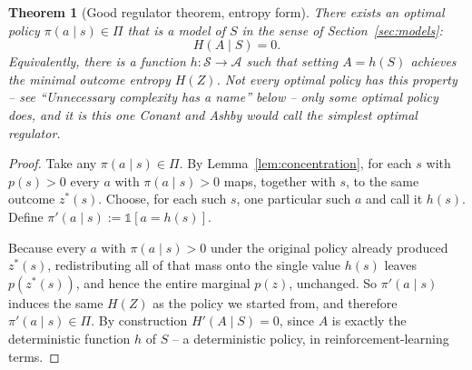 \documentclass[11pt]{article}
\newtheorem{theorem}{Theorem}
\theoremstyle{definition}
\theoremstyle{remark}
\newcommand{\Scal}{\mathcal{S}}
\newcommand{\Acal}{\mathcal{A}}
\begin{document}
\begin{theorem}[Good regulator theorem, entropy form]
\label{thm:goodreg}
There exists an optimal policy $\pi(a\mid s)\in\Pi$ that is a
\emph{model} of $S$ in the sense of Section~\ref{sec:models}:
\[
H(A\mid S) = 0.
\]
Equivalently, there is a function $h:\Scal\to\Acal$ such that setting
$A=h(S)$ achieves the minimal outcome entropy $H(Z)$. Not every optimal
policy has this property -- see ``Unnecessary complexity has a name''
below -- only some optimal policy does, and it is this one Conant and
Ashby would call the \emph{simplest} optimal regulator.
\end{theorem}

\begin{proof}
Take any $\pi(a\mid s)\in\Pi$. By Lemma~\ref{lem:concentration}, for each
$s$ with $p(s)>0$ every $a$ with $\pi(a\mid s)>0$ maps, together with $s$,
to the same outcome $z^\ast(s)$. Choose, for each such $s$, one particular
such $a$ and call it $h(s)$. Define $\pi'(a\mid s) := \mathbb{1}[a=h(s)]$.

Because every $a$ with $\pi(a\mid s)>0$ under the original policy already
produced $z^\ast(s)$, redistributing all of that mass onto the single
value $h(s)$ leaves $p(z^\ast(s))$, and hence the entire marginal $p(z)$,
unchanged. So $\pi'(a\mid s)$ induces the same $H(Z)$ as the policy we
started from, and therefore $\pi'(a\mid s)\in\Pi$. By construction
$H'(A\mid S)=0$, since $A$ is exactly the deterministic function $h$ of
$S$ -- a deterministic policy, in reinforcement-learning terms.
\end{proof}
\end{document}

